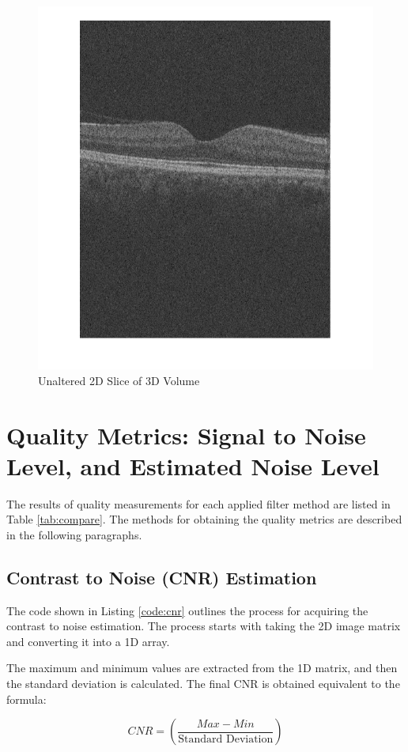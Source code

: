 \documentclass[%
reprint,
showpacs,preprintnumbers,
bibnotes,
amsmath,amssymb,
aps,
pra,
]{revtex4-1}
\begin{document}
		\begin{figure}
			\centering
			\includegraphics[width=0.8\linewidth]{Figures/2dslice}
			\caption{Unaltered 2D Slice of 3D Volume}
			\label{fig:2dslice}
		\end{figure}

	\section{\label{sec:level1} Quality Metrics: Signal to Noise Level, and Estimated Noise Level}
		The results of quality measurements for each applied filter method are listed in Table \ref{tab:compare}. The methods for obtaining the quality metrics are described in the following paragraphs.

	\subsection{\label{sec:level2} Contrast to Noise (CNR) Estimation}
		The code shown in Listing \ref{code:cnr} outlines the process for acquiring the contrast to noise estimation. The process starts with taking the 2D image matrix and converting it into a 1D array.

		The maximum and minimum values are extracted from the 1D matrix, and then the standard deviation is calculated. The final CNR is obtained equivalent to the formula:

		$$CNR = (\frac{Max-Min}{\text{Standard Deviation}})$$
\end{document}
